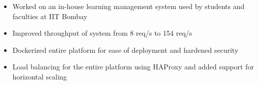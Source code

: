 \documentclass[10pt,a4paper]{altacv}
\begin{document}
\begin{itemize}
    \item Worked on an in-house learning management system used by students and faculties at IIT Bombay
    \item Improved throughput of system from 8 req/s to 154 req/s
    \item Dockerized entire platform for ease of deployment and hardened security
    \item Load balancing for the entire platform using HAProxy and added support for horizontal scaling
\end{itemize}

\end{document}
